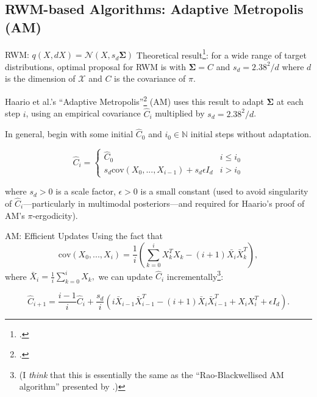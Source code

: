 \documentclass[aspectratio=169]{beamer}
\let\oldfootnote\footnote
\renewcommand{\footnote}{\only<+->\oldfootnote}
\begin{document}
\subsection{RWM-based Algorithms: Adaptive Metropolis (AM)}
\begin{frame}{RWM: $q(X, dX) = \mathcal{N}(X, s_d \bm{\Sigma})$}
    \alert{Theoretical result}\footcite{gelman_efficient_1996}: for a wide range of target distributions, optimal proposal for RWM is with $\bm{\Sigma} = C$ and $s_d = 2.38^2/d$ where $d$ is the dimension of $\mathcal{X}$ and $C$ is the covariance of $\pi$.

    \pause 
    \vspace{1em}

    Haario et al.'s ``Adaptive Metropolis''\footcite{haario_adaptive_2001} (AM) uses this result to adapt $\bm{\Sigma}$ at each step $i$, using an empirical covariance $\hat{C}_i$ multiplied by $s_d = 2.38^2/d$.

    \onslide<+-> 
    \vspace{1em}
    In general, begin with some initial $\hat{C}_0$ and $i_0 \in \mathbb{N}$ initial steps without adaptation.
    
    $$\hat{C}_i = \begin{cases}
            \hat{C}_0 & i \leq i_0 \\
            s_d \text{cov}(X_0, ..., X_{i-1}) + s_d \epsilon I_d & i > i_0
    \end{cases}$$
    \pause

    where $s_d > 0$ is a scale factor, $\epsilon > 0$ is a small constant (used to avoid singularity of $\hat{C}_i$---particularly in multimodal posteriors---and required for Haario's proof of AM's $\pi$-ergodicity).
    
\end{frame}

\begin{frame}{AM: Efficient Updates}
    Using the fact that 
    $$\text{cov}(X_0, ..., X_{i}) = \frac{1}{i} \left(\sum_{k=0}^{i} X_k^T X_k - (i+1)\bar{X_i}\bar{X}_k^T\right),$$
    where $\bar{X}_i = \frac{1}{i} \sum_{k=0}^i X_k,$ we can update $\hat{C}_i$ incrementally\footnote{(I \textit{think} that this is essentially the same as the ``Rao-Blackwellised AM algorithm'' presented by \cite{andrieu_tutorial_2008}.)}:

    $$\hat{C}_{i+1} = \frac{i-1}{i}\hat{C}_i + \frac{s_d}{i}(i\bar{X}_{i-1}\bar{X}_{i-1}^T - (i+1) \bar{X}_{i}\bar{X}_{i-1}^T + X_i X_i^T + \epsilon I_d).$$

\end{frame}
\end{document}
